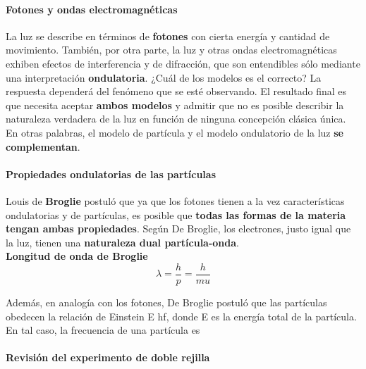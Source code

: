 \documentclass[10pt]{article}
\begin{document}
\paragraph{Fotones y ondas electromagnéticas}

La luz se describe en términos de \textbf{fotones} con cierta energía y cantidad de movimiento. También, por otra parte, la luz y otras ondas electromagnéticas exhiben efectos de interferencia y de difracción, que son entendibles sólo mediante una interpretación \textbf{ondulatoria}. ¿Cuál de los modelos es el correcto? La respuesta dependerá del fenómeno que se esté observando.  El resultado final es que necesita aceptar \textbf{ambos modelos} y admitir que no es posible describir la naturaleza verdadera de la luz en función de ninguna concepción clásica única. En otras palabras, el modelo de partícula y el modelo ondulatorio de la luz \textbf{se complementan}.

\paragraph{Propiedades ondulatorias de las partículas}

Louis de \textbf{Broglie} postuló que ya que los fotones tienen a la vez características ondulatorias y de partículas, es posible que \textbf{todas las formas de la materia tengan ambas propiedades}. Según De Broglie, los electrones, justo igual que la luz, tienen una \textbf{naturaleza dual partícula-onda}.\\
\linebreak
\textbf{Longitud de onda de Broglie}
\begin{equation*}
	\lambda = \dfrac{h}{p} = \dfrac{h}{mu}
\end{equation*}

Además, en analogía con los fotones, De Broglie postuló que las partículas obedecen la relación de Einstein E  hƒ, donde E es la energía total de la partícula. En tal caso, la frecuencia de una partícula es

\paragraph{Revisión del experimento de doble rejilla}
\end{document}
